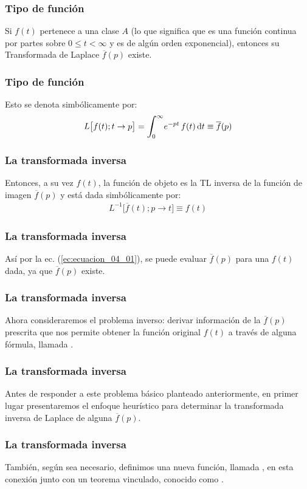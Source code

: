 \begin{frame}
\frametitle{Tipo de función}
Si $f (t)$ pertenece a una clase $A$ (lo que significa que es una función continua por partes sobre $0 \leq t < \infty$ y es de algún orden exponencial), \pause entonces su Transformada de Laplace $\overline{f} (p)$ existe.
\end{frame}
\begin{frame}
\frametitle{Tipo de función}
Esto se denota simbólicamente por:
\pause
\begin{align}
L \big[  f (t); t \to p  \big] = \scaleint{6ex}_{\bs 0}^{\infty} e^{-p t} \, f (t) \dd{t} \equiv \overline{f} (p)
\label{ec:ecuacion_04_01}
\end{align}
\end{frame}
\begin{frame}
\frametitle{La transformada inversa}    
Entonces, a su vez $f (t)$, la función de objeto es la TL inversa de la función de imagen $\overline{f} (p)$ y está dada simbólicamente por:
\pause
\begin{align}
L^{-1} \big[  \overline{f} (t); p \to t  \big] \equiv f (t)
\label{ec:ecuacion_04_02}
\end{align}
\end{frame}
\begin{frame}
\frametitle{La transformada inversa}    
Así por la ec. (\ref{ec:ecuacion_04_01}), se puede evaluar $\overline{f} (p)$ para una $f (t)$ dada, ya que $\overline{f} (p)$ existe.
\end{frame}
\begin{frame}
\frametitle{La transformada inversa}    
Ahora consideraremos el problema inverso: \pause derivar información de la $\overline{f} (p)$ prescrita que nos permite obtener la función original $f (t)$ a través de alguna fórmula, llamada .
\end{frame}
\begin{frame}
\frametitle{La transformada inversa}    
Antes de responder a este problema básico planteado anteriormente, \pause en primer lugar presentaremos el enfoque heurístico para determinar la transformada inversa de Laplace de alguna $\overline{f} (p)$.
\end{frame}
\begin{frame}
\frametitle{La transformada inversa}    
También, según sea necesario, definimos una nueva función, \pause llamada , en esta conexión junto con un teorema vinculado, conocido como .
\end{frame}

